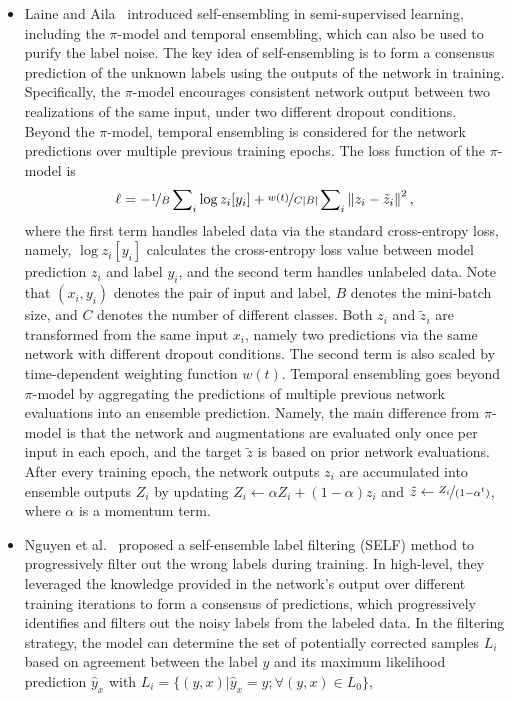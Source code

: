 \begin{itemize}[leftmargin=*]
\item Laine and Aila~ introduced self-ensembling in semi-supervised learning, including the $\pi$-model and temporal ensembling, which can also be used to purify the label noise. The key idea of self-ensembling is to form a consensus prediction of the unknown labels using the outputs of the network in training. Specifically, the $\pi$-model encourages consistent network output between two realizations of the same input, under two different dropout conditions. 
Beyond the $\pi$-model, temporal ensembling is considered for the network predictions over multiple previous training epochs. 
The loss function of the $\pi$-model is
\begin{equation}
\ell = -\nicefrac{1}{B}\sum\nolimits_i
\log z_i[y_i] + \nicefrac{w(t)}{C|B|}
\sum\nolimits_i \left\|z_i-\tilde{z}_i\right\|^2,
\end{equation}
where the first term handles labeled data via the standard cross-entropy loss, namely, $\log z_i[y_i]$ calculates the cross-entropy loss value between model prediction $z_i$ and label $y_i$, and the second term handles unlabeled data. Note that $(x_i,y_i)$ denotes the pair of input and label, $B$ denotes the mini-batch size, and $C$ denotes the number of different classes. Both $z_i$ and $\tilde{z}_i$ are transformed from the same input $x_i$, namely two predictions via the same network with different dropout conditions. The second term is also scaled by time-dependent weighting function $w(t)$. Temporal ensembling goes beyond $\pi$-model by aggregating the predictions of multiple previous network evaluations into an ensemble prediction. Namely, the main difference from $\pi$-model is that the network and augmentations are evaluated only once per input in each epoch, and the target $\tilde{z}$ is based on prior network evaluations. 
After every training epoch, 
the network outputs $z_i$ are accumulated into ensemble outputs $Z_i$ by updating $Z_i \leftarrow \alpha Z_i + (1-\alpha)z_i$ and $\tilde{z} \leftarrow \nicefrac{Z_i}{(1-\alpha^t)}$, where $\alpha$ is a momentum term.
\item
Nguyen et al.~ proposed a self-ensemble label filtering (SELF) method to progressively filter out the wrong labels during training. 
In high-level, they leveraged the knowledge provided in the network's output over different training iterations to form a consensus of predictions, which progressively identifies and filters out the noisy labels from the labeled data. In the filtering strategy, the model can determine the set of potentially corrected samples $L_i$ based on agreement between the label $y$ and its maximum likelihood prediction $\hat{y}_x$ with $L_i = \{(y,x)|\hat{y}_x = y; \forall (y,x) \in L_0\}$,

\end{itemize}
